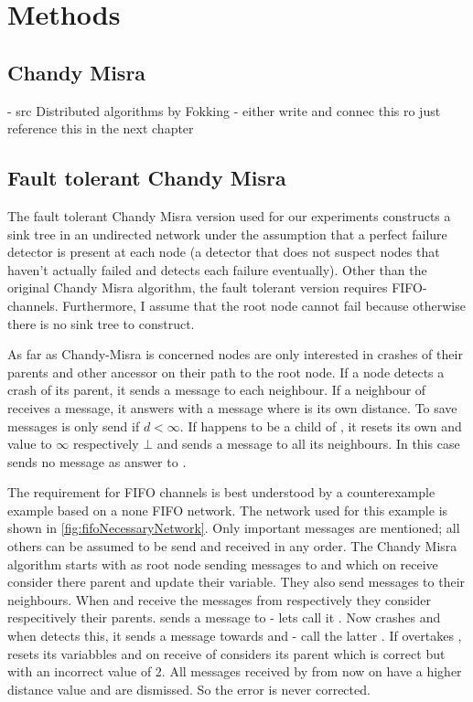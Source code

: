 \section{Methods}  %
\label{sec:methods}
\subsection{Chandy Misra}
 - src Distributed algorithms by Fokking
 - either write and connec this ro just reference this in the next chapter
\subsection {Fault tolerant Chandy Misra}
\label{ssec:fault-tolerant-chandy-misra}
  The fault tolerant Chandy Misra version used for our experiments constructs a sink tree in an undirected network under the assumption that a perfect failure detector is present at each node (a detector that does not suspect nodes that haven't actually failed and   detects each failure eventually). 
  Other than the original Chandy Misra algorithm, the fault tolerant version requires FIFO-channels.
  Furthermore, I assume that the root node cannot fail because otherwise there is no sink tree to construct.
  
  As far as Chandy-Misra is concerned nodes are only interested in crashes of their parents and other ancessor on their path to the root node.
  If a node  detects a crash of its parent, it sends a  message to each neighbour. 
  If a neighbour  of  receives a  message, it answers with a  message where  is its own distance. 
  To save messages  is only send if $d < \infty $.
  If  happens to be a child of , it resets its own  and  value to $\infty$ respectively $\bot$ and sends a  message to all its neighbours. In this case  sends no  message as answer to .
  
  The requirement for FIFO channels is best understood by a counterexample example based on a none FIFO network.
  The network used for this example is shown in \cref{fig:fifoNecessaryNetwork}. 
  Only important messages are mentioned; all others can be assumed to be send and received in any order.
  The Chandy Misra algorithm starts with  as root node sending  messages to  and  which on receive consider  there parent and update their  variable.
  They also send  messages to their neighbours. 
  When  and  receive the  messages from  respectively  they consider  respecitively  their parents.
   sends a  message to  - lets call it .
  Now  crashes and when  detects this, it sends a  message towards  and  - call the latter .
  If  overtakes ,  resets its variabbles and on receive of  considers  its parent which is correct but with an incorrect  value of 2.
  All  messages received by  from now on have a higher distance value and are dismissed. 
  So the error is never corrected.
  
